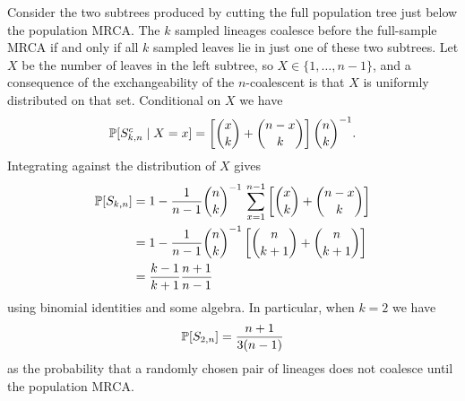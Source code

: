 Consider the two subtrees produced by cutting the full population tree just below the population MRCA. The $k$ sampled lineages coalesce before the full-sample MRCA if and only if all $k$ sampled leaves lie in just one of these two subtrees.
Let $X$ be the number of leaves in the left subtree, so $X \in \{1,\dots,n-1\} $, and a consequence of the exchangeability of the $n$-coalescent is that $X$ is uniformly distributed on that set.
Conditional on $X$ we have
\begin{equation*}
\mathbb{P} [S_{k,n}^c \mid X=x]
= \left[ \binom{x}{k} + \binom{n-x}{k} \right] \binom{n}{k}^{-1} .
\end{equation*}
Integrating against the distribution of $X$ gives
\begin{align*}
\mathbb{P}[ S_{k,n} ]
&= 1 - \frac{1}{n-1} \binom{n}{k}^{-1} \, \sum_{x=1}^{n-1} 
        \left[ \binom{x}{k} + \binom{n-x}{k} \right] \\
&= 1 - \frac{1}{n-1} \binom{n}{k}^{-1} 
        \left[ \binom{n}{k+1} + \binom{n}{k+1} \right] \\
&= \frac{k-1}{k+1} \frac{n+1}{n-1}
\end{align*}
using binomial identities and some algebra.
In particular, when $k=2$ we have
\begin{equation*}
\mathbb{P}[ S_{2,n} ]
=\frac{n+1}{3(n-1)} 
\end{equation*}
as the probability that a randomly chosen pair of lineages does not coalesce until the population MRCA.
%
%



